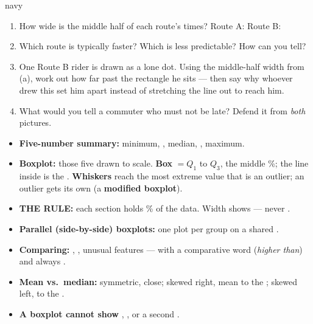\documentclass[12pt]{article}
\newcommand{\answerspace}[2]{\par\nopagebreak\noindent\begin{minipage}[t][#1][t]{\linewidth}%
  \color{keyred}\bfseries #2\end{minipage}\par}
\begin{document}
\begin{scenariobox}{navy}
\normalsize
\begin{enumerate}[label=\textbf{\alph*.}, leftmargin=1.8em, itemsep=4pt]
  \item How wide is the middle half of each route's times? \quad Route A: \blank{2.6cm} \quad
        Route B: \blank{2.6cm}
  \item Which route is typically faster? Which is less predictable? How can you tell?
        \answerspace{1.6cm}{}
  \item One Route B rider is drawn as a lone dot. Using the middle-half width from (a), work out
        how far past the rectangle he sits --- then say why whoever drew this set him apart
        instead of stretching the line out to reach him.
        \answerspace{2.0cm}{}
  \item What would you tell a commuter who must not be late? Defend it from \emph{both} pictures.
        \answerspace{1.4cm}{}
\end{enumerate}
\end{scenariobox}

\boxguard[14]
\begin{tcolorbox}[enhanced, colback=sky, colframe=navy, boxrule=0.8pt, arc=2mm,
    left=3mm, right=3mm, top=1.5mm, bottom=1.5mm, breakable,
    fonttitle=\bfseries\small\color{white}, title={QuickNotes: Boxplots and Comparing Distributions},
    attach boxed title to top left={yshift=-2mm, xshift=4mm},
    boxed title style={colback=navy, colframe=navy, arc=1.5mm}]
\small
\begin{itemize}[leftmargin=1.1em, itemsep=3pt]
  \item \textbf{Five-number summary:} minimum, \blank{1.3cm}, median, \blank{1.3cm}, maximum.
  \item \textbf{Boxplot:} those five drawn to scale. \textbf{Box} $= Q_1$ to $Q_3$, the middle
        \blank{1.2cm}\%; the line inside is the \blank{2.0cm}. \textbf{Whiskers} reach the most
        extreme value that is \blank{1.4cm} an outlier; an outlier gets its own \blank{1.8cm}
        (a \textbf{modified boxplot}).
  \item \textbf{THE RULE:} each section holds \blank{1.2cm}\% of the data. Width shows
        \blank{1.8cm} --- never \blank{1.5cm}.
  \item \textbf{Parallel (side-by-side) boxplots:} one plot per group on a shared \blank{1.6cm}.
  \item \textbf{Comparing:} \blank{1.6cm}, \blank{2.2cm}, unusual features --- with a comparative
        word (\emph{higher than}) and always \blank{2.2cm}.
  \item \textbf{Mean vs.\ median:} symmetric, close; skewed right, mean to the \blank{1.3cm};
        skewed left, to the \blank{1.3cm}.
  \item \textbf{A boxplot cannot show} \blank{1.5cm}, \blank{1.8cm}, or a second \blank{1.4cm}.
\end{itemize}
\end{tcolorbox}
\end{document}
